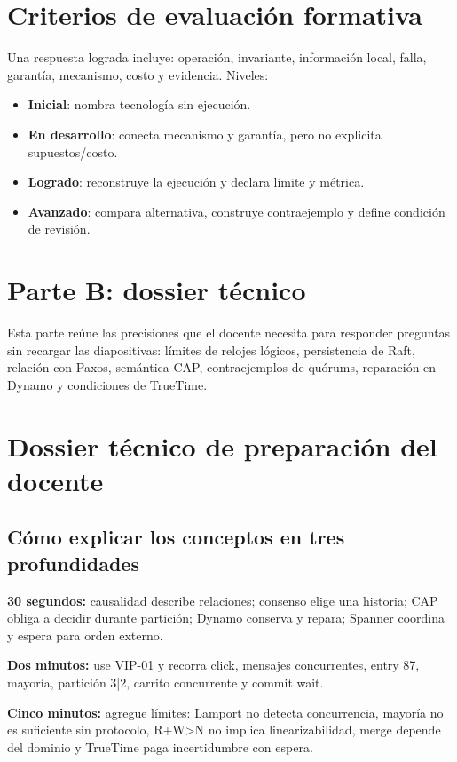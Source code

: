 \documentclass[variant=docente,cover=institutional,mode=screen]{ua-engineering-v6-article}
\begin{document}
\section{Criterios de evaluación formativa}
Una respuesta lograda incluye: operación, invariante, información local, falla, garantía, mecanismo, costo y evidencia. Niveles:
\begin{itemize}
\item \textbf{Inicial}: nombra tecnología sin ejecución.
\item \textbf{En desarrollo}: conecta mecanismo y garantía, pero no explicita supuestos/costo.
\item \textbf{Logrado}: reconstruye la ejecución y declara límite y métrica.
\item \textbf{Avanzado}: compara alternativa, construye contraejemplo y define condición de revisión.
\end{itemize}

\section{Parte B: dossier técnico}
Esta parte reúne las precisiones que el docente necesita para responder preguntas sin recargar las diapositivas: límites de relojes lógicos, persistencia de Raft, relación con Paxos, semántica CAP, contraejemplos de quórums, reparación en Dynamo y condiciones de TrueTime.

\section{Dossier técnico de preparación del docente}
\subsection{Cómo explicar los conceptos en tres profundidades}
\textbf{30 segundos:} causalidad describe relaciones; consenso elige una historia; CAP obliga a decidir durante partición; Dynamo conserva y repara; Spanner coordina y espera para orden externo.

\textbf{Dos minutos:} use VIP-01 y recorra click, mensajes concurrentes, entry 87, mayoría, partición 3|2, carrito concurrente y commit wait.

\textbf{Cinco minutos:} agregue límites: Lamport no detecta concurrencia, mayoría no es suficiente sin protocolo, R+W>N no implica linearizabilidad, merge depende del dominio y TrueTime paga incertidumbre con espera.
\end{document}

